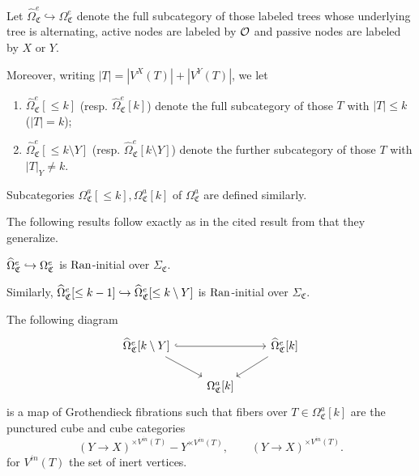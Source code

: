 \documentclass[a4paper,10pt
,draft
]{article}%
\renewcommand{\1}{\eta}%
\newcommand{\SC}{\Sigma_{\mathfrak C}}
\newcommand{\OC}{\Omega_{\mathfrak C}}
\begin{document}
\begin{definition}
      Let
$\widehat{\Omega}_{\mathfrak C}^{e} \hookrightarrow \Omega_{\mathfrak C}^{e}$
denote the full subcategory of those labeled trees whose underlying tree is alternating, active nodes are labeled by $\mathcal{O}$ 
and passive nodes are labeled by $X$ or $Y$.

Moreover, writing $|T| = |V^X(T)|+ |V^Y(T)|$, we let
\begin{enumerate}[label=(\roman*)]
\item $\widehat{\Omega}_{\mathfrak C}^{e}[\leq k]$ (resp. $\widehat{\Omega}_{\mathfrak C}^{e}[k]$)
denote the full subcategory of those $T$ with $|T| \leq k$ ($|T|=k$);
\item $\widehat{\Omega}_{\mathfrak C}^{e}[\leq k \setminus Y]$ (resp. $\widehat{\Omega}_{\mathfrak C}^{e}[k \setminus Y]$)
denote the further subcategory of those $T$ with $|T|_Y \neq k$.
\end{enumerate}
Subcategories $\OC^a[\leq k], \OC^a[k]$ of $\OC^a$ are defined similarly.
\end{definition}



The following results follow exactly as in the cited result from 
\cite{BP_geo} that they generalize.

\begin{lemma}
\label{LANINT LEM}

	$\widehat\Omega_{\mathfrak C}^e \hookrightarrow 
	\Omega_{\mathfrak C}^e$
	is $\operatorname{Ran}$-initial over $\SC$.
     
	Similarly, $\widehat\Omega_{\mathfrak C}^e[\leq k-1] \hookrightarrow 
\widehat\Omega_{\mathfrak C}^e[\leq k \setminus Y]$
	is $\operatorname{Ran}$-initial over $\SC$.
\end{lemma}

\begin{remark}
      \label{OEFIB REM}
      The following diagram
      \begin{equation}
            \begin{tikzcd}
                  \widehat\Omega_{\mathfrak C}^e[k \setminus Y] \arrow[rr, hookrightarrow] \arrow[dr]
                  &&
                  \widehat\Omega_{\mathfrak C}^e[k] \arrow[dl]
                  \\
                  &
                  \Omega_{\mathfrak C}^a[k]
            \end{tikzcd}
      \end{equation}
	is a map of Grothendieck fibrations
	such that fibers over $T \in \Omega_{\mathfrak C}^a[k]$ are the punctured cube and cube categories
      \begin{equation}
            (Y \to X)^{\times V^{in}(T)} - Y^{\times V^{in}(T)},
            \qquad
            (Y \to X)^{\times V^{in}(T)}.
      \end{equation}
	for $V^{in}(T)$ the set of inert vertices.
\end{remark}
\end{document}
